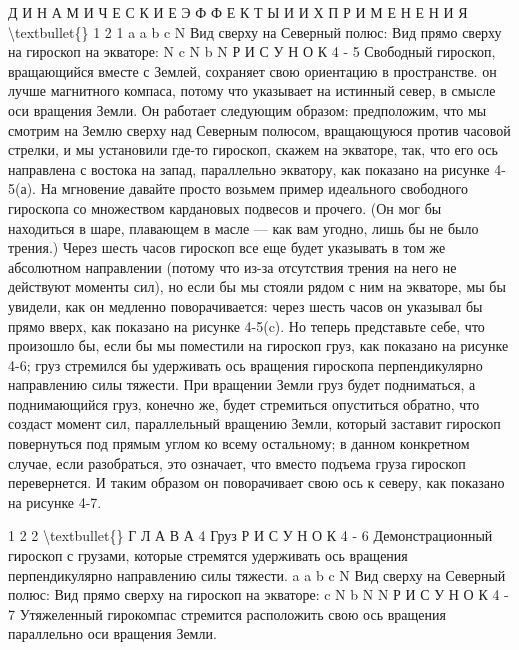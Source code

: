 \documentclass[10pt,oneside]{article}
\begin{document}
Д И Н А М И Ч Е С К И Е  Э Ф Ф Е К Т Ы  И  И Х  П Р И М Е Н Е Н И Я \textbackslash{}textbullet\{\} 1 2 1 a a b c N Вид сверху на Северный полюс: Вид прямо сверху на гироскоп на экваторе: N c N b N Р И С У Н О К  4 - 5 Свободный гироскоп, вращающийся вместе с Землей, сохраняет свою ориентацию в пространстве. он лучше магнитного компаса, потому что указывает на истинный север, в смысле оси вращения Земли. Он работает следующим образом: предположим, что мы смотрим на Землю сверху над Северным полюсом, вращающуюся против часовой стрелки, и мы установили где-то гироскоп, скажем на экваторе, так, что его ось направлена с востока на запад, параллельно экватору, как показано на рисунке 4-5(а). На мгновение давайте просто возьмем пример идеального свободного гироскопа со множеством кардановых подвесов и прочего. (Он мог бы находиться в шаре, плавающем в масле --- как вам угодно, лишь бы не было трения.) Через шесть часов гироскоп все еще будет указывать в том же абсолютном направлении (потому что из-за отсутствия трения на него не действуют моменты сил), но если бы мы стояли рядом с ним на экваторе, мы бы увидели, как он медленно поворачивается: через шесть часов он указывал бы прямо вверх, как показано на рисунке 4-5(c). Но теперь представьте себе, что произошло бы, если бы мы поместили на гироскоп груз, как показано на рисунке 4-6; груз стремился бы удерживать ось вращения гироскопа перпендикулярно направлению силы тяжести. При вращении Земли груз будет подниматься, а поднимающийся груз, конечно же, будет стремиться опуститься обратно, что создаст момент сил, параллельный вращению Земли, который заставит гироскоп повернуться под прямым углом ко всему остальному; в данном конкретном случае, если разобраться, это означает, что вместо подъема груза гироскоп перевернется. И таким образом он поворачивает свою ось к северу, как показано на рисунке 4-7.\par

1 2 2 \textbackslash{}textbullet\{\} Г Л А В А  4 Груз Р И С У Н О К  4 - 6 Демонстрационный гироскоп с грузами, которые стремятся удерживать ось вращения перпендикулярно направлению силы тяжести. a a b c N Вид сверху на Северный полюс: Вид прямо сверху на гироскоп на экваторе: c N b N N Р И С У Н О К  4 - 7 Утяжеленный гирокомпас стремится расположить свою ось вращения параллельно оси вращения Земли.\par
\end{document}
